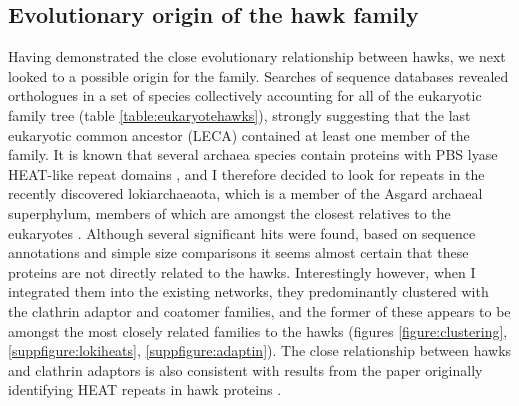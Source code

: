 \documentclass[a4paper,11pt,twoside,openright]{scrbook}
\begin{document}
\subsection{Evolutionary origin of the hawk family}
Having demonstrated the close evolutionary relationship between hawks, we next looked to a possible origin for the family. Searches of sequence databases revealed orthologues in a set of species collectively accounting for all of the eukaryotic family tree (table \ref{table:eukaryotehawks}), strongly suggesting that the last eukaryotic common ancestor (LECA) contained at least one member of the family. It is known that several archaea species contain proteins with PBS lyase HEAT-like repeat domains \cite{Schlesner2009}, and I therefore decided to look for repeats in the recently discovered lokiarchaeaota, which is a member of the Asgard archaeal superphylum, members of which are amongst the closest relatives to the eukaryotes \cite{Spang2015,Zaremba-Niedzwiedzka2017}. Although several significant hits were found, based on sequence annotations and simple size comparisons it seems almost certain that these proteins are not directly related to the hawks. Interestingly however, when I integrated them into the existing networks, they predominantly clustered with the clathrin adaptor and coatomer families, and the former of these appears to be amongst the most closely related families to the hawks (figures \ref{figure:clustering}, \ref{suppfigure:lokiheats}, \ref{suppfigure:adaptin}). The close relationship between hawks and clathrin adaptors is also consistent with results from the paper originally identifying HEAT repeats in hawk proteins \cite{Neuwald2000}.
\end{document}
